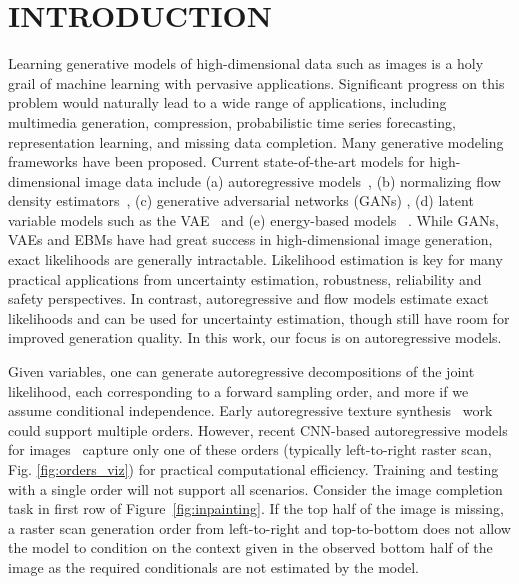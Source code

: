\documentclass[letterpaper]{article}
\begin{document}
\section{INTRODUCTION}
Learning generative models of high-dimensional data such as images is a holy grail of machine learning with pervasive applications. 
Significant progress on this problem would naturally lead to a wide range of applications, including multimedia generation, compression, probabilistic time series forecasting, representation learning, and missing data completion.
Many generative modeling frameworks have been proposed.
Current state-of-the-art models for high-dimensional image data include
(a) autoregressive models~\citep{bengio2000modeling,efros1999texture}, (b) normalizing flow density estimators~\citep{rezende2015variational}, (c) generative adversarial networks (GANs) \citep{goodfellow2014generative}, (d) latent variable models such as the VAE~\citep{kingma2013auto,rezende2014stochastic} and (e) energy-based models \eg{}~\cite{hinton2002training, lecun2006tutorial, NIPS2019_8619, song2019generative}. While GANs, VAEs and EBMs have had great success in high-dimensional image generation, exact likelihoods are generally intractable. Likelihood estimation is key for many practical applications from uncertainty estimation, robustness, reliability and safety perspectives.
In contrast, autoregressive and flow models estimate exact likelihoods and can be used for uncertainty estimation, though still have room for improved generation quality. In this work, our focus is on autoregressive models.

Given  variables, one can generate  autoregressive decompositions of the joint likelihood, each corresponding to a forward sampling order, and more if we assume conditional independence. Early autoregressive texture synthesis~\citep{popat1993novel,efros1999texture} work could support multiple orders. However, recent CNN-based autoregressive models for images~\citep{oord2016pixel,van2016conditional,salimans2017pixelcnnpp} capture only one of these orders (typically left-to-right raster scan, Fig. \ref{fig:orders_viz}) for practical computational efficiency. 
Training and testing with a single order will not support all scenarios. Consider the image completion task in first row of Figure~\ref{fig:inpainting}. If the top half of the image is missing, a raster scan generation order from left-to-right and top-to-bottom does not allow the model to condition on the context given in the observed bottom half of the image as the required conditionals are not estimated by the model.
\end{document}
